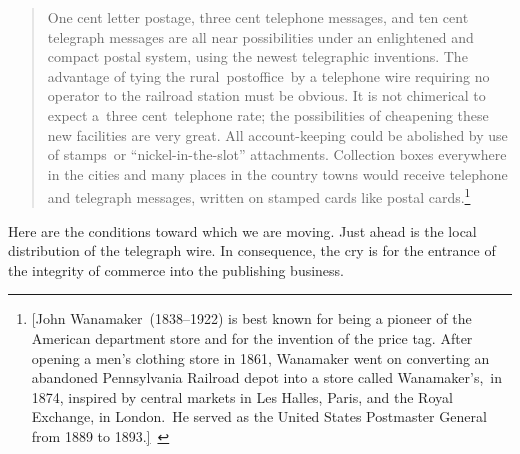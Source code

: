 \documentclass[openany,nobib]{tufte-book}
\begin{document}
\begin{quote}
One cent letter postage, three cent telephone messages, and ten cent
telegraph messages are all near possibilities under an enlightened and
compact postal system, using the newest telegraphic inventions. The
advantage of tying the rural~postoffice~by a telephone wire requiring no
operator to the railroad station must be obvious. It is not chimerical
to expect a~three cent~telephone rate; the possibilities of cheapening
these new facilities are very great. All account-keeping could be
abolished by use of stamps~or ``nickel-in-the-slot'' attachments.
Collection boxes everywhere in the cities and many places in the country
towns would receive telephone and telegraph messages, written on stamped
cards like postal cards.\footnote{{[}John Wanamaker~(1838--1922) is best
  known for being a pioneer of the American department store and for the
  invention of the price tag. After opening a men's clothing store in
  1861, Wanamaker went on converting an abandoned Pennsylvania Railroad
  depot into a store called Wanamaker's,~in 1874, inspired by central
  markets in Les Halles, Paris, and the Royal Exchange, in London.~He
  served as the United States Postmaster General from 1889 to
  1893.\href{applewebdata://D02306DF-3E46-4684-BD1A-1A323FFB2CB2\#_msocom_1}{{]}}~}
\end{quote}

\noindent Here are the conditions toward which we are moving. Just ahead is the
local distribution of the telegraph wire. In consequence, the cry is for
the entrance of the integrity of commerce into the publishing business.~
\end{document}
